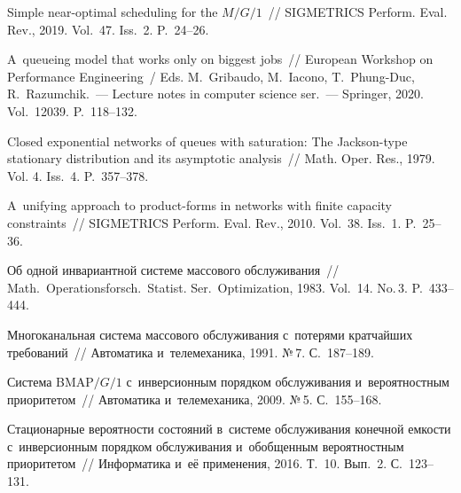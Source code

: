 \begin{multicols}{2}
{{\begin{thebibliography}{99}
Simple near-optimal scheduling for the $M/G/1$~//
SIGMETRICS Perform. Eval. Rev., 2019. Vol.~47. Iss.~2. P.~24--26.


 A~queueing model that works
only on biggest jobs~// European Workshop on Performance Engineering~/ 
Eds. M.~Gribaudo, M.~Iacono, T.~Phung-Duc, R.~Razumchik.~--- Lecture 
notes in computer science ser.~--- Springer, 2020. Vol.~12039. P.~118--132.


Closed exponential networks of queues with saturation: The Jackson-type 
stationary distribution and its asymptotic analysis~//
Math. Oper. Res., 1979. Vol. 4. Iss.~4. P.~357--378.

A~unifying approach to product-forms in
networks with finite capacity constraints~//
SIGMETRICS Perform. Eval. Rev., 2010. Vol.~38. Iss.~1. P.~25--36.

 Об одной
инвариантной системе массового обслуживания~//
Math.\ Operationsforsch.\ Statist.
Ser.\ Optimization, 1983. Vol.~14. No.\,3. P.~433--444.



Многоканальная система массового обслуживания с~потерями кратчайших 
требований~// Автоматика и~телемеханика, 1991. №\,7. С.~187--189.


 Система BMAP${/G/1}$ с~инверсионным порядком 
обслуживания и~вероятностным приоритетом~// Автоматика и~телемеханика, 2009. 
№\,5. С.~155--168.


Стационарные вероятности состояний в~системе обслуживания конечной 
емкости с~инверсионным порядком обслуживания и~обобщенным вероятностным 
приоритетом~// Информатика и~её применения, 2016. Т.~10. Вып.~2. С.~123--131.


\end{thebibliography}}}
\end{multicols}
